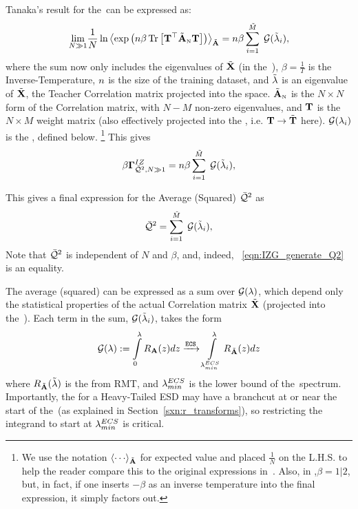 Tanaka's result for the~\ECS can be expressed as:
\begin{equation}
  \label{eqn:tanaka_result}
  \underset{N\gg 1}{\lim}\frac{1}{N}\ln
\Expected[\AECS]{\exp\left(\ND\beta \Trace{\TMAT^{\top}\AECSN\TMAT}\right)}
  =\ND\beta\sum\limits_{i=1}^{\MECS}\;\GNECSI,
\end{equation}
where the sum now only includes the eigenvalues of $\tilde{\mathbf{X}}$ (in the~\ECS), $\beta=\tfrac{1}{T}$
is the Inverse-Temperature, $n$ is the size of the training dataset, and $\tilde{\lambda}$ is an eigenvalue of $\tilde{\mathbf{X}}$, the Teacher
Correlation matrix projected into the \ECS space.
$\tilde{\mathbf{A}}_{\text{\tiny N}}$ is the $N \times N$ form of the \Student Correlation matrix,
with $N-M$ non-zero eigenvalues, and ${\mathbf{T}}$ is the $N\times M$ \Teacher  weight matrix
(also effectively projected into the \ECS, i.e. ${\mathbf{T}}\rightarrow\tilde{\mathbf{T}}$ here).
$\mathcal{G}(\lambda_{i})$ is the \GEN, defined below.
\footnote{We use the notation $\Expected[\AECS]{\cdots}$ for expected value and placed $\tfrac{1}{N}$ on the L.H.S.
to help the reader compare this to the original expressions in~\cite{Tanaka2007, Tanaka2008}.
Also,  in \cite{Tanaka2007, Tanaka2008},$\beta=1|2$, but, in fact, if one inserts $-\beta$ as an inverse temperature into the final expression, it simply factors out.}
This gives
\begin{equation}
\label{eqn:tanaka_result2}
\IZGINF = \ND\beta\sum\limits_{i=1}^{\MECS}\;\GNECSI,
\end{equation}

This gives a final expression for the Average \LayerQuality (Squared) $\bar{\mathcal{Q}}^{2}$ as
\begin{equation}
\label{eqn:Q2_result}
\QT = \sum\limits_{i=1}^{\MECS}\;\GNECSI,
\end{equation}
Note that $\bar{\mathcal{Q}}^{2}$ is independent of $N$ and $\beta$,
and, indeed, \EQN~\ref{eqn:IZG_generate_Q2} is an equality.

The average \Quality (squared) can be expressed as a sum over
\GeneratingFunctions $\mathcal{G(\lambda)}$, which depend only the statistical properties of the
actual \Teacher Correlation  matrix  $\tilde{\mathbf{X}}$ (projected into the~\ECS).
Each term in the sum, $\mathcal{G}(\tilde{\lambda}_{i})$, takes the form
\begin{equation}
\label{eqn:generating_function_A}
 \GN:=\int\limits_{0}^{\lambda}R_{\AMAT}(z)dz \xrightarrow{\text{\ECS}}\int\limits_{\LambdaECSmin}^{\lambda}R_{\AECS}(z)dz
\end{equation}
where $R_{\tilde{\mathbf{A}}}(\tilde{\lambda})$ is the \RTransform from RMT,
and $\lambda^{ECS}_{min}$ is the lower bound of the~\ECS spectrum.
Importantly, the \RTransform for a Heavy-Tailed ESD may have a branchcut at or near the
start of the~\ECS (as explained in Section~\ref{sxn:r_transforms}), so restricting the integrand
to start at $\lambda^{ECS}_{min}$ is critical.

